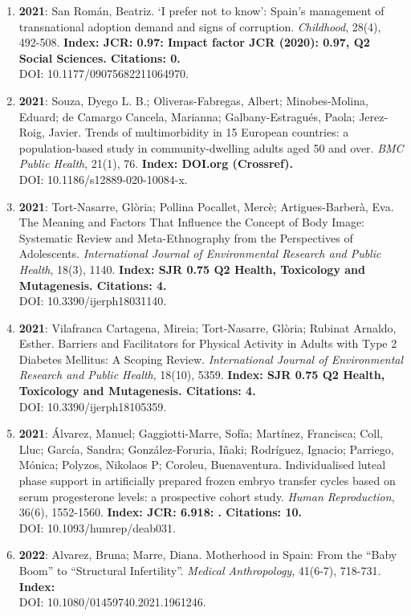 \begin{enumerate}
\item {\bf 2021}: San Román, Beatriz.  ‘I prefer not to know’: Spain’s management of transnational adoption demand and signs of corruption. {\it Childhood}, 28(4), 492-508. {\bf Index: JCR: 0.97: Impact factor JCR (2020): 0.97, Q2 Social Sciences.  Citations: 0. } \\ DOI: 10.1177/09075682211064970. \filbreak
\item {\bf 2021}: Souza, Dyego L. B.; Oliveras-Fabregas, Albert; Minobes-Molina, Eduard; de Camargo Cancela, Marianna; Galbany-Estragués, Paola; Jerez-Roig, Javier.  Trends of multimorbidity in 15 European countries: a population-based study in community-dwelling adults aged 50 and over. {\it BMC Public Health}, 21(1), 76. {\bf Index: DOI.org (Crossref). } \\ DOI: 10.1186/s12889-020-10084-x. \filbreak
\item {\bf 2021}: Tort-Nasarre, Glòria; Pollina Pocallet, Mercè; Artigues-Barberà, Eva.  The Meaning and Factors That Influence the Concept of Body Image: Systematic Review and Meta-Ethnography from the Perspectives of Adolescents. {\it International Journal of Environmental Research and Public Health}, 18(3), 1140. {\bf Index: SJR 0.75 Q2 Health, Toxicology and Mutagenesis. Citations: 4. } \\ DOI: 10.3390/ijerph18031140. \filbreak
\item {\bf 2021}: Vilafranca Cartagena, Mireia; Tort-Nasarre, Glòria; Rubinat Arnaldo, Esther.  Barriers and Facilitators for Physical Activity in Adults with Type 2 Diabetes Mellitus: A Scoping Review. {\it International Journal of Environmental Research and Public Health}, 18(10), 5359. {\bf Index: SJR 0.75 Q2 Health, Toxicology and Mutagenesis. Citations: 4. } \\ DOI: 10.3390/ijerph18105359. \filbreak
\item {\bf 2021}: Álvarez, Manuel; Gaggiotti-Marre, Sofía; Martínez, Francisca; Coll, Lluc; García, Sandra; González-Foruria, Iñaki; Rodríguez, Ignacio; Parriego, Mónica; Polyzos, Nikolaos P; Coroleu, Buenaventura.  Individualised luteal phase support in artificially prepared frozen embryo transfer cycles based on serum progesterone levels: a prospective cohort study. {\it Human Reproduction}, 36(6), 1552-1560. {\bf Index: JCR: 6.918: .  Citations: 10. } \\ DOI: 10.1093/humrep/deab031. \filbreak
\item {\bf 2022}: Alvarez, Bruna; Marre, Diana.  Motherhood in Spain: From the “Baby Boom” to “Structural Infertility”. {\it Medical Anthropology}, 41(6-7), 718-731. {\bf Index: } \\ DOI: 10.1080/01459740.2021.1961246. \filbreak

\end{enumerate}

